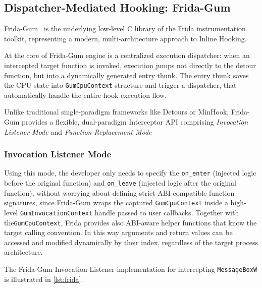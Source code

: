 \subsection{Dispatcher-Mediated Hooking: Frida-Gum}
\label{subsec:frida_arch}
Frida-Gum~\cite{repo:frida-gum} is the underlying low-level C library of the Frida instrumentation toolkit, representing a modern, multi-architecture approach to Inline Hooking.

At the core of Frida-Gum engine is a centralized execution dispatcher: when an intercepted target function is invoked, execution jumps not directly to the detour function, but into a dynamically generated entry thunk. The entry thunk saves the CPU state into \texttt{GumCpuContext} structure and trigger a dispatcher, that automatically handle the entire hook execution flow.

Unlike traditional single-paradigm frameworks like Detours or MinHook, Frida-Gum provides a flexible, dual-paradigm Interceptor \ac{API} comprising \emph{Invocation Listener Mode} and \emph{Function Replacement Mode}

\subsubsection{Invocation Listener Mode}
Using this mode, the developer only needs to specify the \texttt{on\_enter} (injected logic before the original function) and \texttt{on\_leave} (injected logic after the original function), without worrying about defining strict ABI compatible function signatures, since Frida-Gum wraps the captured \texttt{GumCpuContext} inside a high-level \texttt{GumInvocationContext} handle passed to user callbacks. Together with the\texttt{GumCpuContext}, Frida provides also ABI-aware helper functions that know the target calling convention. In this way arguments and return values can be accessed and modified dynamically by their index, regardless of the target process architecture.

The Frida-Gum Invocation Listener implementation for intercepting \texttt{MessageBoxW} is illustrated in \cref{lst:frida}.

